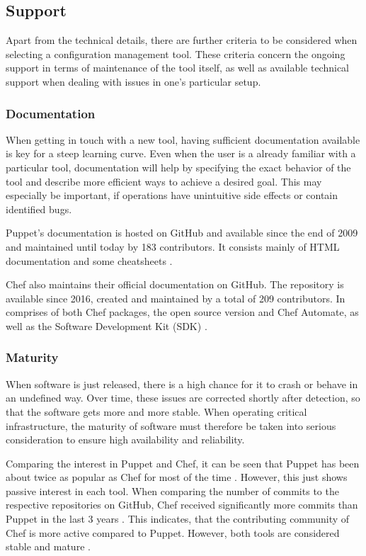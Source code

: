 \subsection{Support}

Apart from the technical details, there are further criteria to be considered when selecting a configuration management tool. These criteria concern the ongoing support in terms of maintenance of the tool itself, as well as available technical support when dealing with issues in one's particular setup.

\subsubsection{Documentation}

When getting in touch with a new tool, having sufficient documentation available is key for a steep learning curve. Even when the user is a already familiar with a particular tool, documentation will help by specifying the exact behavior of the tool and describe more efficient ways to achieve a desired goal. This may especially be important, if operations have unintuitive side effects or contain identified bugs.

Puppet's documentation is hosted on GitHub and available since the end of 2009 and maintained until today by 183 contributors. It consists mainly of HTML documentation and some cheatsheets \cite{githubpuppetdocs}.

Chef also maintains their official documentation on GitHub. The repository is available since 2016, created and maintained by a total of 209 contributors. In comprises of both Chef packages, the open source version and Chef Automate, as well as the Software Development Kit (SDK) \cite{githubchefdocs}.

\subsubsection{Maturity}

When software is just released, there is a high chance for it to crash or behave in an undefined way. Over time, these issues are corrected shortly after detection, so that the software gets more and more stable. When operating critical infrastructure, the maturity of software must therefore be taken into serious consideration to ensure high availability and reliability.

Comparing the interest in Puppet and Chef, it can be seen that Puppet has been about twice as  popular as Chef for most of the time \cite{googlepuppetvschef}. However, this just shows passive interest in each tool. When comparing the number of commits to the respective repositories on GitHub, Chef received significantly more commits than Puppet in the last 3 years \cite{githubpuppetpulse} \cite{githubchefpulse}. This indicates, that the contributing community of Chef is more active compared to Puppet. However, both tools are considered stable and mature \cite{delaet2010survey}.

